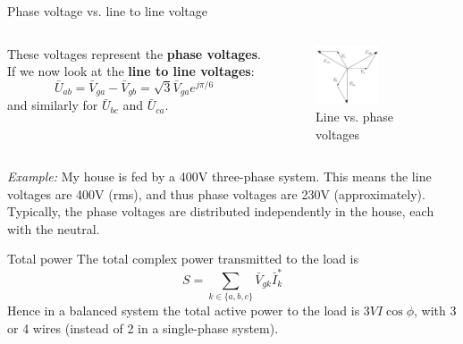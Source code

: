 \begin{frame}{Phase voltage vs. line to line voltage}

    \begin{columns}
    \begin{column}{0.5\textwidth}
        These voltages represent the \textbf{phase voltages}. If we now look at the \textbf{line to line voltages}:
        $$
        \bar{U}_{ab} = \bar{V}_{ga} - \bar{V}_{gb} = \sqrt{3} \bar{V}_{ga} e^{j\pi / 6}
        $$
        and similarly for $\bar{U}_{bc}$ and $\bar{U}_{ca}$.
    \end{column}
    \begin{column}{0.5\textwidth}
        \begin{figure}
        \centering
        \includegraphics[width=0.6\textwidth]{images/line_vs_phase_voltage_diagram.png}
        \caption{Line vs. phase voltages}
        \end{figure}
    \end{column}
\end{columns}

\textit{Example:} My house is fed by a 400V three-phase system. This means the line voltages are 400V (rms), and thus phase voltages are 230V (approximately). Typically, the phase voltages are distributed independently in the house, each with the neutral.

\end{frame}

\begin{frame}{Total power}
    The total complex power transmitted to the load is
    $$
    S = \sum_{k \in \{a, b, c\}} \bar{V}_{gk} \bar{I}^*_{k}
    $$
    Hence in a balanced system the total active power to the load is $3VI \cos \phi$, with 3 or 4 wires (instead of 2 in a single-phase system).
\end{frame}


